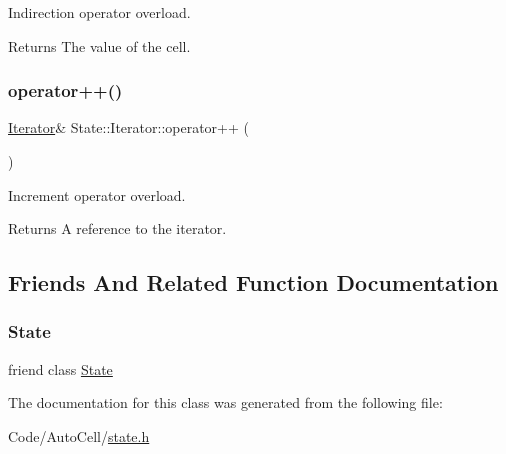 Indirection operator overload.

\begin{DoxyReturn}{Returns}
The value of the cell. 
\end{DoxyReturn}
\mbox{\label{class_state_1_1_iterator_a0e1e8b3a2b802a43f5436eccfb15b9a7}} 
\subsubsection{\texorpdfstring{operator++()}{operator++()}}
{\footnotesize\ttfamily \mbox{\hyperlink{class_state_1_1_iterator}{Iterator}}\& State\+::\+Iterator\+::operator++ (\begin{DoxyParamCaption}{ }\end{DoxyParamCaption})\hspace{0.3cm}{\ttfamily [inline]}}

Increment operator overload.

\begin{DoxyReturn}{Returns}
A reference to the iterator. 
\end{DoxyReturn}


\subsection{Friends And Related Function Documentation}
\mbox{\label{class_state_1_1_iterator_a7edbf9e31116a21e4e18cd2dd004ae63}} 
\subsubsection{\texorpdfstring{State}{State}}
{\footnotesize\ttfamily friend class \mbox{\hyperlink{class_state}{State}}\hspace{0.3cm}{\ttfamily [friend]}}



The documentation for this class was generated from the following file\+:\begin{DoxyCompactItemize}
\item 
Code/\+Auto\+Cell/\mbox{\hyperlink{state_8h}{state.\+h}}\end{DoxyCompactItemize}
